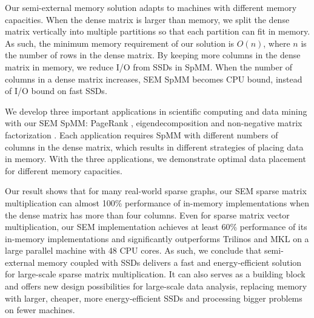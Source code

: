 Our semi-external memory solution adapts to machines with different memory
capacities. When the dense matrix is larger than memory, we split the dense
matrix vertically into multiple partitions so that each partition can fit in
memory. As such, the minimum memory requirement of our solution is $O(n)$,
where $n$ is the number of rows in the dense matrix. By keeping more columns
in the dense matrix in memory, we reduce I/O from SSDs in SpMM. When the number
of columns in a dense matrix increases, SEM SpMM becomes CPU bound, instead of
I/O bound on fast SSDs.

We develop three important applications in scientific computing and
data mining with our SEM SpMM: PageRank \cite{pagerank}, eigendecomposition
\cite{} and non-negative matrix factorization \cite{nmf}. Each application
requires SpMM with different numbers of columns in the dense matrix, which
results in different strategies of placing data in memory.
With the three applications, we demonstrate optimal data placement for
different memory capacities.


Our result shows that for many real-world sparse graphs, our SEM sparse matrix
multiplication can almost 100\% performance of in-memory implementations
when the dense matrix has more than four columns. Even for sparse matrix vector
multiplication, our SEM implementation achieves at least 60\% performance of
its in-memory implementations and significantly outperforms Trilinos \cite{trilinos}
and MKL \cite{mkl} on a large parallel machine with 48 CPU cores.
 As such, we conclude that
semi-external memory coupled with SSDs delivers a fast and energy-efficient
solution for large-scale sparse matrix multiplication. It can also serves
as a building block and offers new design possibilities for large-scale
data analysis, replacing memory with larger, cheaper, more energy-efficient SSDs
and processing bigger problems on fewer machines.
